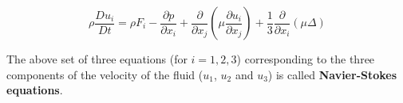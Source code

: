 \begin{equation}
\label{ns0}
\boxed{
\rho \frac{Du_i}{Dt} = \rho F_i -  \frac{\partial p}{\partial x_i} +  
\frac{\partial}{\partial x_j} \left( \mu \frac{\partial u_i}{\partial x_j} \right) + 
\frac{1}{3}\frac{\partial}{\partial x_i} \left( \mu \Delta \right) 
}
\end{equation} 

The above set of three equations (for $i=1,2,3$) corresponding to the three components of the velocity of the fluid ($u_1$, $u_2$ and $u_3$) is called {\bf Navier-Stokes equations}.




